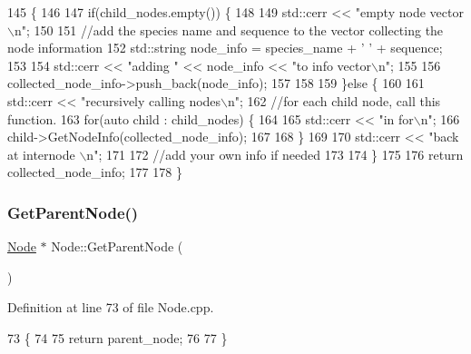 \begin{DoxyCode}
145                                                                                 \{
146   
147   \textcolor{keywordflow}{if}(child\_nodes.empty()) \{
148     
149     std::cerr << \textcolor{stringliteral}{"empty node vector\(\backslash\)n"};
150     
151     \textcolor{comment}{//add the species name and sequence to the vector collecting the node information}
152     std::string node\_info = species\_name + \textcolor{charliteral}{' '} + sequence;
153     
154     std::cerr << \textcolor{stringliteral}{"adding "} << node\_info << \textcolor{stringliteral}{"to info vector\(\backslash\)n"};
155     
156     collected\_node\_info->push\_back(node\_info);
157     
158     
159   \}\textcolor{keywordflow}{else} \{
160     
161     std::cerr << \textcolor{stringliteral}{"recursively calling nodes\(\backslash\)n"};
162     \textcolor{comment}{//for each child node, call this function.}
163     \textcolor{keywordflow}{for}(\textcolor{keyword}{auto} child : child\_nodes) \{
164       
165       std::cerr << \textcolor{stringliteral}{"in for\(\backslash\)n"}; 
166       child->GetNodeInfo(collected\_node\_info);
167       
168     \}
169     
170     std::cerr << \textcolor{stringliteral}{"back at internode \(\backslash\)n"};
171     
172     \textcolor{comment}{//add your own info if needed}
173     
174   \}
175   
176   \textcolor{keywordflow}{return} collected\_node\_info;
177   
178 \}
\end{DoxyCode}
\mbox{\label{classNode_a032d93c17743138203c77c721edfdae6}} 
\subsubsection{\texorpdfstring{Get\+Parent\+Node()}{GetParentNode()}}
{\footnotesize\ttfamily \hyperlink{classNode}{Node} $\ast$ Node\+::\+Get\+Parent\+Node (\begin{DoxyParamCaption}{ }\end{DoxyParamCaption})}



Definition at line 73 of file Node.\+cpp.


\begin{DoxyCode}
73                          \{
74   
75   \textcolor{keywordflow}{return} parent\_node;
76   
77 \}
\end{DoxyCode}
\mbox{\label{classNode_a69f309f68de4f08e950a15ae79571ec0}} 
